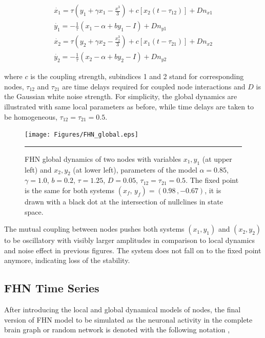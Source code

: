 \begin{subequations}
 \begin{align}\dot{x_1} = \tau (y_1 + \gamma x_1 - \frac{x^3}{3}) + c [x_2(t-\tau_{12})] +Dn_{x1} \label{eqn: frobenius 14}\\  \dot{y_1} = -\frac{1}{\tau} (x_1 - \alpha + b y_1 - I )+ Dn_{y1} \label{eqn: frobenius 15} \\ \dot{x_2} = \tau (y_2 + \gamma x_2 - \frac{x_2^3}{3}) + c [x_1(t-\tau_{21})] + Dn_{x2} \label{eqn: frobenius 16} \\  \dot{y_2} = -\frac{1}{\tau} (x_2 - \alpha + b y_2 - I ) + Dn_{y2}\end{align} 
\end{subequations}
 
where $c$ is the coupling strength, subindices 1 and 2 stand for corresponding nodes, $\tau_{12}$ and $\tau_{21}$ are time delays required for coupled node interactions and $D$ is the Gaussian white noise strength. For simplicity, the global dynamics are illustrated with same local parameters as before, while time delays are taken to be homogeneous, $\tau_{12}=\tau_{21}=0.5$.

\begin{figure}[htbp]
  \centering
	\texttt{[image: Figures/FHN\_global.eps]}
 
    \rule{35em}{0.5pt}
    \caption[FHN Global]{FHN global dynamics of two nodes with variables $x_1,y_1$ (at upper left) and  $x_2,y_2$ (at lower left),  parameters of the model $\alpha=0.85$, $\gamma=1.0$, $b=0.2$, $\tau=1.25$, $D=0.05$, $\tau_{12} = \tau_{21}=0.5$. The fixed point is the same for both systems $(x_f, \, y_f) = (0.98 \, , -0.67 )$, it is drawn with a black dot at the intersection of nullclines in state space.}
  \label{fig:FHN Global}	
\end{figure}

The mutual coupling between nodes pushes both systems $(x_1,y_1)$ and $(x_2,y_2)$ to be oscillatory with visibly larger amplitudes in comparison to local dynamics and noise effect in previous figures. The system does not fall on to the fixed point anymore, indicating loss of the stability. 

\subsection{FHN Time Series}

After introducing the local and global dynamical models of nodes, the final version of FHN model to be simulated as the neuronal activity in the complete brain graph or random network is denoted with the following notation \citep{VUK13},  
 
